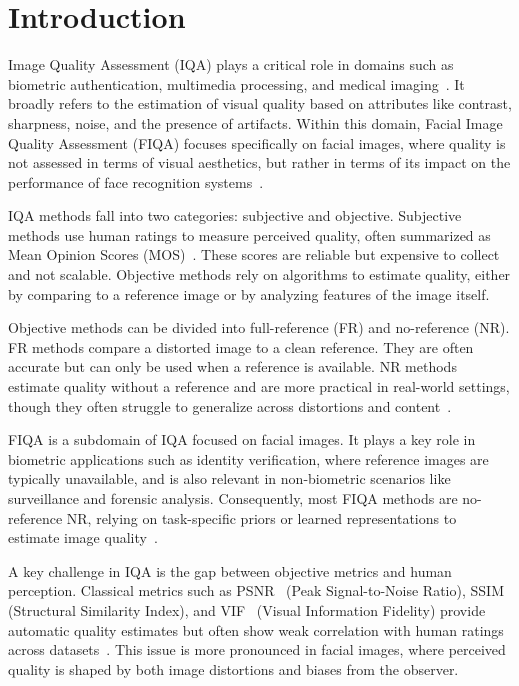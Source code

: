 \section{Introduction}

Image Quality Assessment (IQA) plays a critical role in domains such as biometric authentication, multimedia processing, and medical imaging~\cite{kim2015face, huang2020facerecon}. It broadly refers to the estimation of visual quality based on attributes like contrast, sharpness, noise, and the presence of artifacts. Within this domain, Facial Image Quality Assessment (FIQA) focuses specifically on facial images, where quality is not assessed in terms of visual aesthetics, but rather in terms of its impact on the performance of face recognition systems~\cite{cavazos2021racebias, terhoerst2020demobias}.

IQA methods fall into two categories: subjective and objective. Subjective methods use human ratings to measure perceived quality, often summarized as Mean Opinion Scores (MOS)~\cite{ITU-R-BT500}. These scores are reliable but expensive to collect and not scalable. Objective methods rely on algorithms to estimate quality, either by comparing to a reference image or by analyzing features of the image itself.

Objective methods can be divided into full-reference (FR) and no-reference (NR). FR methods compare a distorted image to a clean reference. They are often accurate but can only be used when a reference is available. NR methods estimate quality without a reference and are more practical in real-world settings, though they often struggle to generalize across distortions and content~\cite{shahrukh2019survey}.

FIQA is a subdomain of IQA focused on facial images. It plays a key role in biometric applications such as identity verification, where reference images are typically unavailable, and is also relevant in non-biometric scenarios like surveillance and forensic analysis. Consequently, most FIQA methods are no-reference NR, relying on task-specific priors or learned representations to estimate image quality~\cite{hernandez2019faceqnet}.

A key challenge in IQA is the gap between objective metrics and human perception. Classical metrics such as PSNR~\cite{gonzalez2002digital} (Peak Signal-to-Noise Ratio), SSIM~\cite{wang2004ssim} (Structural Similarity Index), and VIF~\cite{sheikh2006image} (Visual Information Fidelity) provide automatic quality estimates but often show weak correlation with human ratings across datasets~\cite{shahrukh2019survey}. This issue is more pronounced in facial images, where perceived quality is shaped by both image distortions and biases from the observer.

